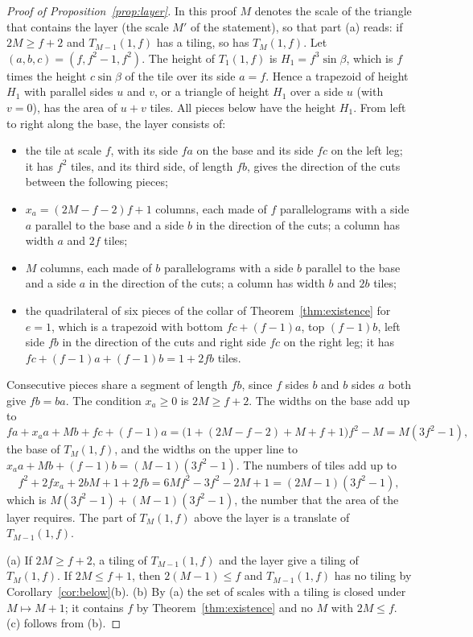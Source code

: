 \documentclass[11pt,reqno]{amsart}
\theoremstyle{plain}
\theoremstyle{definition}
\begin{document}
\begin{proof}[Proof of Proposition~\ref{prop:layer}]
In this proof $M$ denotes the scale of the triangle that contains the layer (the scale $M'$ of the statement), so
that part \textup{(a)} reads: if $2M\ge f+2$ and $T_{M-1}(1,f)$ has a tiling, so has $T_M(1,f)$.
Let $(a,b,c)=(f,f^2-1,f^2)$. The height of $T_1(1,f)$ is $H_1=f^3\sin\beta$, which is $f$ times the height
$c\sin\beta$ of the tile over its side $a=f$. Hence a trapezoid of height $H_1$ with parallel sides $u$ and
$v$, or a triangle of height $H_1$ over a side $u$ (with $v=0$), has the area of $u+v$ tiles. All pieces
below have the height $H_1$. From left to right along the base, the layer consists of:
\begin{itemize}
\item the tile at scale $f$, with its side $fa$ on the base and its side $fc$ on the left leg; it has $f^2$
tiles, and its third side, of length $fb$, gives the direction of the cuts between the following pieces;
\item $x_a=(2M-f-2)f+1$ columns, each made of $f$ parallelograms with a side $a$ parallel to the base and a
side $b$ in the direction of the cuts; a column has width $a$ and $2f$ tiles;
\item $M$ columns, each made of $b$ parallelograms with a side $b$ parallel to the base and a side $a$ in
the direction of the cuts; a column has width $b$ and $2b$ tiles;
\item the quadrilateral of six pieces of the collar of Theorem~\ref{thm:existence} for $e=1$, which is a
trapezoid with bottom $fc+(f-1)a$, top $(f-1)b$, left side $fb$ in the direction of the cuts and right side
$fc$ on the right leg; it has $fc+(f-1)a+(f-1)b=1+2fb$ tiles.
\end{itemize}
Consecutive pieces share a segment of length $fb$, since $f$ sides $b$ and $b$ sides $a$ both give
$fb=ba$. The condition $x_a\ge0$ is $2M\ge f+2$. The widths on the base add up to
\[
fa+x_aa+Mb+fc+(f-1)a=\bigl(1+(2M-f-2)+M+f+1\bigr)f^2-M=M(3f^2-1),
\]
the base of $T_M(1,f)$, and the widths on the upper line to $x_aa+Mb+(f-1)b=(M-1)(3f^2-1)$. The numbers of
tiles add up to
\[
f^2+2fx_a+2bM+1+2fb=6Mf^2-3f^2-2M+1=(2M-1)(3f^2-1),
\]
which is $M(3f^2-1)+(M-1)(3f^2-1)$, the number that the area of the layer requires. The part of $T_M(1,f)$
above the layer is a translate of $T_{M-1}(1,f)$.

(a) If $2M\ge f+2$, a tiling of $T_{M-1}(1,f)$ and the layer give a tiling of $T_M(1,f)$. If $2M\le f+1$,
then $2(M-1)\le f$ and $T_{M-1}(1,f)$ has no tiling by Corollary~\ref{cor:below}(b). (b) By (a) the set of
scales with a tiling is closed under $M\mapsto M+1$; it contains $f$ by Theorem~\ref{thm:existence} and no
$M$ with $2M\le f$. (c) follows from (b).
\end{proof}
\end{document}
